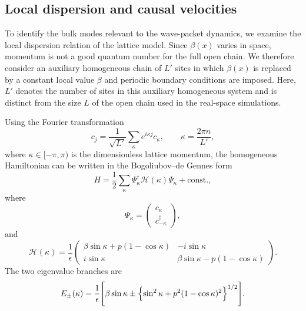 \documentclass[reprint,amsmath,amssymb,aps,showkeys,superscriptaddress]{revtex4-2}
\begin{document}
\subsection{Local dispersion and causal velocities}
\label{subsec:dispersion}

To identify the bulk modes relevant to the wave-packet dynamics, we
examine the local dispersion relation of the lattice model. Since
$\beta(x)$ varies in space, momentum is not a good quantum number for
the full open chain. We therefore consider an auxiliary homogeneous
chain of $L'$ sites in which $\beta(x)$ is replaced by a constant
local value $\beta$ and periodic boundary conditions are imposed.
Here, $L'$ denotes the number of sites in this auxiliary homogeneous
system and is distinct from the size $L$ of the open chain used in
the real-space simulations.

Using the Fourier transformation
\begin{equation}
  c_j
  =
  \frac{1}{\sqrt{L'}}
  \sum_{\kappa}
  e^{i\kappa j}c_{\kappa},
  \qquad
  \kappa=\frac{2\pi n}{L'},
  \label{eq:Fourier_transform}
\end{equation}
where $\kappa\in[-\pi,\pi)$ is the dimensionless lattice momentum,
the homogeneous Hamiltonian can be written in the
Bogoliubov--de Gennes form
\begin{equation}
  H
  =
  \frac{1}{2}
  \sum_{\kappa}
  \Psi_{\kappa}^{\dagger}
  \mathcal{H}(\kappa)
  \Psi_{\kappa}
  +\mathrm{const.},
  \label{eq:BdG_Hamiltonian}
\end{equation}
where
\begin{equation}
  \Psi_{\kappa}
  =
  \begin{pmatrix}
    c_{\kappa}\\
    c_{-\kappa}^{\dagger}
  \end{pmatrix},
  \label{eq:Nambu_spinor}
\end{equation}
and
\begin{equation}
  \mathcal{H}(\kappa)
  =
  \frac{1}{\epsilon}
  \begin{pmatrix}
    \beta\sin\kappa
    +p(1-\cos\kappa)
      & -i\sin\kappa
    \\
    i\sin\kappa
      & \beta\sin\kappa
        -p(1-\cos\kappa)
  \end{pmatrix}.
  \label{eq:BdG_matrix}
\end{equation}
The two eigenvalue branches are
\begin{equation}
\begin{aligned}
  E_{\pm}(\kappa)
  =
  \frac{1}{\epsilon}
  \Biggl[
    \beta\sin\kappa
    \mathbin{\pm}
    \Bigl\{
      \sin^{2}\kappa
      +p^{2}(1-\cos\kappa)^{2}
    \Bigr\}^{1/2}
  \Biggr].
\end{aligned}
  \label{eq:lattice_dispersion}
\end{equation}
\end{document}
